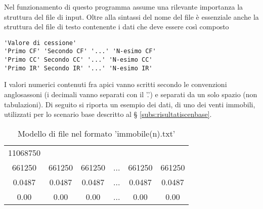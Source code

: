 Nel funzionamento di questo programma assume una rilevante importanza la struttura del file di input. Oltre alla sintassi del nome del file è essenziale anche la struttura del file di testo contenente i dati che deve essere così composto
\begin{verbatim}
'Valore di cessione'
'Primo CF' 'Secondo CF' '...' 'N-esimo CF'
'Primo CC' Secondo CC' '...' 'N-esimo CC'
'Primo IR' Secondo IR' '...' 'N-esimo IR'
\end{verbatim}
I valori numerici contenuti fra apici vanno scritti secondo le convenzioni anglosassoni (i decimali vanno separati con il '.') e separati da un solo spazio (non tabulazioni).
Di seguito si riporta un esempio dei dati, di uno dei venti immobili, utilizzati per lo scenario base descritto al § \ref{subs:risultatiscenbase}.
\begin{table}[htbp]
\begin{center}
\begin{tabular}[c]{|*{6}{c}|}
\hline
11068750 &  &  &  &  &    \\
661250 & 661250 & 661250 & ... & 661250 & 661250 \\
0.0487 & 0.0487 & 0.0487 & ... & 0.0487 & 0.0487 \\
0.00 & 0.00 & 0.00 & ... & 0.00 & 0.00 \\
\hline
\end{tabular}
\caption{Modello di file nel formato 'immobile(n).txt'}
\end{center}
\end{table}